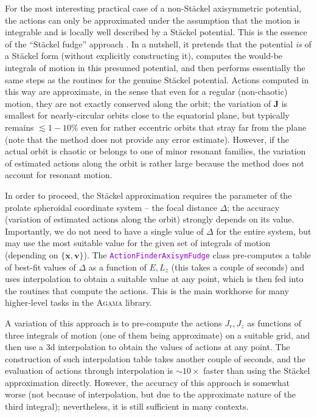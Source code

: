 \documentclass[12pt]{article}
\newcommand{\Agama}{\textsc{Agama}\xspace}
\newcommand{\ttt}[1]{\textcolor{darkviolet}{\texttt{#1}}}
\newcommand{\bv}{\boldsymbol{v}}
\newcommand{\bx}{\boldsymbol{x}}
\newcommand{\bJ}{\boldsymbol{J}}
\begin{document}
For the most interesting practical case of a non-St\"ackel axisymmetric potential, the actions can only be approximated under the assumption that the motion is integrable and is locally well described by a St\"ackel potential. This is the essence of the ``St\"ackel fudge'' approach \cite{Binney2012}. In a nutshell, it pretends that the potential \textit{is} of a St\"ackel form (without explicitly constructing it), computes the would-be integrals of motion in this presumed potential, and then performs essentially the same steps as the routines for the genuine St\"ackel potential. Actions computed in this way are approximate, in the sense that even for a regular (non-chaotic) motion, they are not exactly conserved along the orbit; the variation of $\bJ$ is smallest for nearly-circular orbits close to the equatorial plane, but typically remains $\lesssim 1-10\%$ even for rather eccentric orbits that stray far from the plane (note that the method does not provide any error estimate). However, if the actual orbit is chaotic or belongs to one of minor resonant families, the variation of estimated actions along the orbit is rather large because the method does not account for resonant motion.

In order to proceed, the St\"ackel approximation requires the parameter of the prolate spheroidal coordinate system -- the focal distance $\Delta$; the accuracy (variation of estimated actions along the orbit) strongly depends on its value. Importantly, we do not need to have a single value of $\Delta$ for the entire system, but may use the most suitable value for the given set of integrals of motion (depending on $\{\bx,\bv\}$).
The \ttt{ActionFinderAxisymFudge} class pre-computes a table of best-fit values of $\Delta$ as a function of $E,L_z$ (this takes a couple of seconds) and uses interpolation to obtain a suitable value at any point, which is then fed into the routines that compute the actions.
This is the main workhorse for many higher-level tasks in the \Agama library.

A variation of this approach is to pre-compute the actions $J_r,J_z$ as functions of three integrals of motion (one of them being approximate) on a suitable grid, and then use a 3d interpolation to obtain the values of actions at any point. The construction of such interpolation table takes another couple of seconds, and the evaluation of actions through interpolation is $\sim 10\times$ faster than using the St\"ackel approximation directly. However, the accuracy of this approach is somewhat worse (not because of interpolation, but due to the approximate nature of the third integral); nevertheless, it is still sufficient in many contexts.
\end{document}
